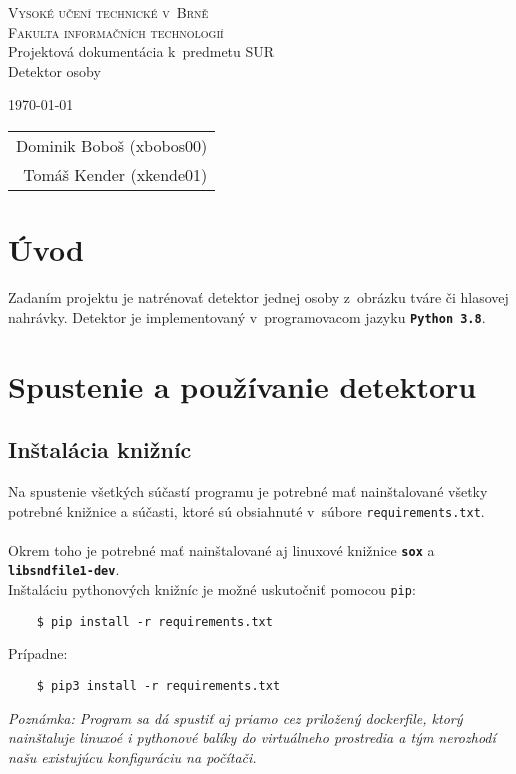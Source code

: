 \documentclass[11pt, a4paper]{article}
\begin{document}
	\begin{titlepage}
		\begin{center}
			\Huge
			\textsc{Vysoké učení technické v~Brně} \\
			\huge
			\textsc{Fakulta informačních technologií} \\
			\LARGE
			Projektová dokumentácia k~predmetu SUR \\
			\Huge
			Detektor osoby
		\end{center}

		{\Large
			\today
			\hfill
			\begin{tabular}{r}
			Dominik Boboš (xbobos00) \\
			Tomáš Kender (xkende01)
			\end{tabular}
		}
	\end{titlepage}
		
	\section{Úvod}
	Zadaním projektu je natrénovať detektor jednej osoby z~obrázku tváre či hlasovej nahrávky. Detektor je implementovaný v~programovacom jazyku \textbf{\texttt{Python\,3.8}}. 
	
	\section{Spustenie a používanie detektoru}
		\subsection{Inštalácia knižníc}
	Na spustenie všetkých súčastí programu je potrebné mať nainštalované všetky potrebné knižnice a súčasti, ktoré sú obsiahnuté v~súbore \texttt{requirements.txt}. \\ \\
Okrem toho je potrebné mať nainštalované aj linuxové knižnice \textbf{\texttt{sox}} a \textbf{\texttt{libsndfile1-dev}}.\\

	Inštaláciu pythonových knižníc je možné uskutočniť pomocou \texttt{pip}:
			\begin{verbatim}
    $ pip install -r requirements.txt
			\end{verbatim}
			
	Prípadne:
			\begin{verbatim}
    $ pip3 install -r requirements.txt
			\end{verbatim}
			\emph{Poznámka: Program sa dá spustiť aj priamo cez priložený dockerfile, ktorý nainštaluje linuxoé i pythonové balíky do virtuálneho prostredia a tým nerozhodí našu existujúcu konfiguráciu na počítači.}
\end{document}
